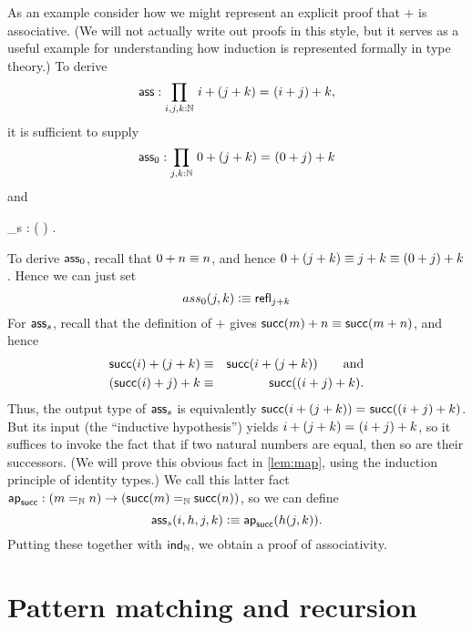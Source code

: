 As an example consider how we might represent an explicit proof that $+$ is associative.
(We will not actually write out proofs in this style, but it serves as a useful example for understanding how induction is represented formally in type theory.)
To derive
\[\ass : \prd{i,j,k:\nat} \id{i + (j + k)}{(i + j) + k}, \]
it is sufficient to supply
\[ \ass_0 :  \prd{j,k:\nat} \id{0 + (j + k)}{(0+ j) + k} \]
and
\begin{narrowmultline*}
  \ass_s  :  \left( \right)
   \narrowbreak
   \to {} .
\end{narrowmultline*}
To derive $\mathsf{ass}_0$, recall that $0+n \equiv n$, and hence  $0 + (j + k) \equiv j+k \equiv (0+ j) + k$.
Hence we can just set
\[ ass_0(j,k) \vcentcolon\equiv \mathsf{refl}_{j+k} \]
For $\mathsf{ass}_s$, recall that the definition of $+$ gives $\mathsf{succ}(m)+n \equiv \mathsf{succ}(m+n)$, and hence 
\begin{eqnarray*}
   \mathsf{succ}(i) + (j + k)  & \equiv & \mathsf{succ}(i+(j+k)) \qquad\text{and}\\
   (\mathsf{succ}(i)+j)+k & \equiv & \mathsf{succ}((i+j)+k).
\end{eqnarray*}
Thus, the output type of $\mathsf{ass}_s$ is equivalently $\mathsf{succ}(i+(j+k)) =_{} \mathsf{succ}((i+j)+k)$.
But its input (the ``inductive hypothesis'')
%
%
yields $i+(j+k) =_{} (i+j)+k$, so it suffices to invoke the fact that if two natural numbers are equal, then so are their successors.
(We will prove this obvious fact in \autoref{lem:map}, using the induction principle of identity types.)
We call this latter fact
$\apfunc{\suc} : %
(\id[\nat]{m}{n}) \to (\id[\nat]{\suc(m)}{\suc(n)})$, so we can define
\[\ass_s(i,h,j,k) \defeq \apfunc{\suc}( %
h(j,k)). \]
Putting these together with $\mathsf{ind}_{\mathbb{N}}$, we obtain a proof of associativity.

%
%


\section{Pattern matching and recursion}
\label{sec:pattern-matching}

